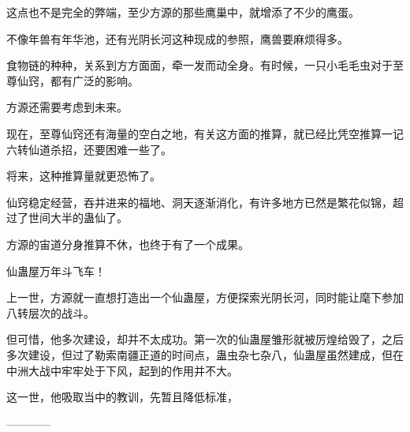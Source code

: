 \begin{this_body}
这点也不是完全的弊端，至少方源的那些鹰巢中，就增添了不少的鹰蛋。

不像年兽有年华池，还有光阴长河这种现成的参照，鹰兽要麻烦得多。

食物链的种种，关系到方方面面，牵一发而动全身。有时候，一只小毛毛虫对于至尊仙窍，都有广泛的影响。

方源还需要考虑到未来。

现在，至尊仙窍还有海量的空白之地，有关这方面的推算，就已经比凭空推算一记六转仙道杀招，还要困难一些了。

将来，这种推算量就更恐怖了。

仙窍稳定经营，吞并进来的福地、洞天逐渐消化，有许多地方已然是繁花似锦，超过了世间大半的蛊仙了。

方源的宙道分身推算不休，也终于有了一个成果。

仙蛊屋万年斗飞车！

上一世，方源就一直想打造出一个仙蛊屋，方便探索光阴长河，同时能让麾下参加八转层次的战斗。

但可惜，他多次建设，却并不太成功。第一次的仙蛊屋雏形就被厉煌给毁了，之后多次建设，但过了勒索南疆正道的时间点，蛊虫杂七杂八，仙蛊屋虽然建成，但在中洲大战中牢牢处于下风，起到的作用并不大。

这一世，他吸取当中的教训，先暂且降低标准，

------------

\end{this_body}

